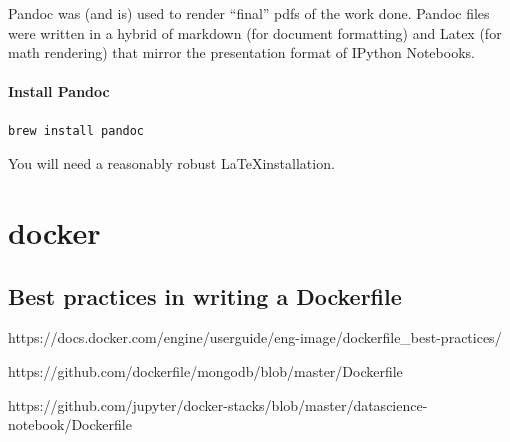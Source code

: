 \documentclass[12pt,]{book}
\newenvironment{Shaded}{}{}
\let\oldparagraph\paragraph
\renewcommand{\paragraph}[1]{\oldparagraph{#1}\mbox{}}
\begin{document}
Pandoc was (and is) used to render ``final'' pdfs of the work done.
Pandoc files were written in a hybrid of markdown (for document
formatting) and Latex (for math rendering) that mirror the presentation
format of IPython Notebooks.

\paragraph{Install Pandoc}

\begin{verbatim}
brew install pandoc
\end{verbatim}

You will need a reasonably robust \LaTeX installation.

\begin{Shaded}
\begin{Highlighting}[]

\end{Highlighting}
\end{Shaded}

\section{docker}\label{docker}

\subsection{Best practices in writing a
Dockerfile}\label{best-practices-in-writing-a-dockerfile}

https://docs.docker.com/engine/userguide/eng-image/dockerfile\_best-practices/

https://github.com/dockerfile/mongodb/blob/master/Dockerfile

https://github.com/jupyter/docker-stacks/blob/master/datascience-notebook/Dockerfile

\begin{Shaded}
\begin{Highlighting}[]

\end{Highlighting}
\end{Shaded}
\end{document}
